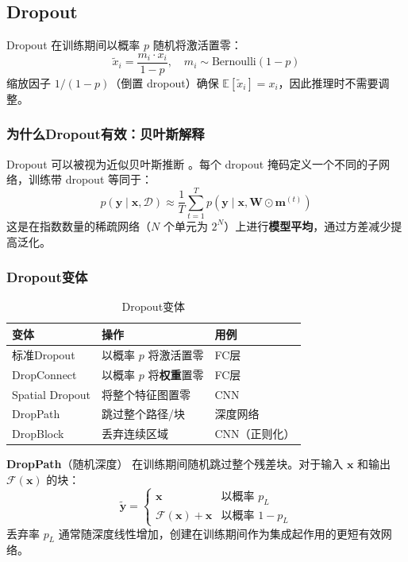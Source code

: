 \subsection{Dropout}

Dropout \cite{srivastava2014dropout} 在训练期间以概率 $p$ 随机将激活置零：
\begin{equation}
\tilde{x}_i = \frac{m_i \cdot x_i}{1 - p}, \quad m_i \sim \text{Bernoulli}(1 - p)
\end{equation}
缩放因子 $1/(1-p)$（倒置 dropout）确保 $\mathbb{E}[\tilde{x}_i] = x_i$，因此推理时不需要调整。

\subsubsection{为什么Dropout有效：贝叶斯解释}

Dropout 可以被视为近似贝叶斯推断 \cite{gal2016dropout}。每个 dropout 掩码定义一个不同的子网络，训练带 dropout 等同于：
\begin{equation}
p(\mathbf{y} \mid \mathbf{x}, \mathcal{D}) \approx \frac{1}{T}\sum_{t=1}^{T} p(\mathbf{y} \mid \mathbf{x}, \mathbf{W} \odot \mathbf{m}^{(t)})
\end{equation}
这是在指数数量的稀疏网络（$N$ 个单元为 $2^N$）上进行\textbf{模型平均}，通过方差减少提高泛化。

\subsubsection{Dropout变体}

\begin{table}[ht]
    \centering
    \caption{Dropout变体}
    \begin{tabular}{L{3cm} L{4.5cm} L{4.5cm}}
        \toprule
        \textbf{变体} & \textbf{操作} & \textbf{用例} \\
        \midrule
        标准Dropout & 以概率 $p$ 将激活置零 & FC层 \\
        DropConnect & 以概率 $p$ 将\textbf{权重}置零 & FC层 \\
        Spatial Dropout & 将整个特征图置零 & CNN \\
        DropPath & 跳过整个路径/块 & 深度网络 \\
        DropBlock & 丢弃连续区域 & CNN（正则化） \\
        \bottomrule
    \end{tabular}
\end{table}

\textbf{DropPath}（随机深度）\cite{huang2016deep} 在训练期间随机跳过整个残差块。对于输入 $\mathbf{x}$ 和输出 $\mathcal{F}(\mathbf{x})$ 的块：
\begin{equation}
\tilde{\mathbf{y}} = \begin{cases} \mathbf{x} & \text{以概率 } p_L \\ \mathcal{F}(\mathbf{x}) + \mathbf{x} & \text{以概率 } 1 - p_L \end{cases}
\end{equation}
丢弃率 $p_L$ 通常随深度线性增加，创建在训练期间作为集成起作用的更短有效网络。

